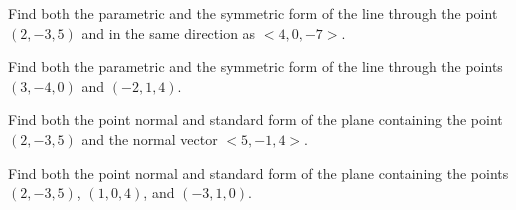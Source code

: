 \documentclass{exam}[12pt]
\begin{document}
\pagestyle{head}

\extraheadheight{.3in}
\extrafootheight{-.3in} 


\vspace{.2in}
\large{

\begin{questions}

\question Find both the parametric and the symmetric form of the line
through the point $(2,-3,5)$ and in the same direction as $<4,0,-7>$.
\vspace{1.7in}

\question Find  both the parametric and the symmetric form of the line
through the points $(3,-4,0)$ and $(-2,1,4)$.
\vspace{2in}

\question Find both the point normal and standard form of the plane 
containing the point $(2,-3,5)$ and the normal vector  $<5,-1,4>$.
\vspace{2in}

\question Find both the point normal and standard form of the plane 
containing the points $(2,-3,5)$, $(1,0,4)$, and $(-3,1,0)$.


\end{questions}

}
\end{document}
